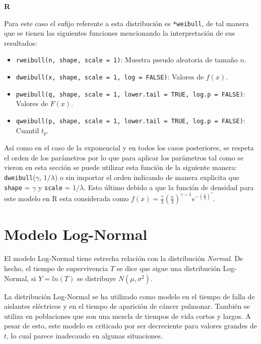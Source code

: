 \documentclass[
  a4paper,
  oneside,
  openany]{book}
\providecommand{\tightlist}{%
  \setlength{\itemsep}{0pt}\setlength{\parskip}{0pt}}
\begin{document}
\textbf{R}

Para este caso el sufijo referente a esta distribución es \texttt{*weibull}, de tal manera que se tienen las siguientes funciones mencionando la interpretación de sus resultados:

\begin{itemize}
\tightlist
\item
  \texttt{rweibull(n,\ shape,\ scale\ =\ 1)}: Muestra pseudo aleatoria de tamaño \(n\).
\item
  \texttt{dweibull(x,\ shape,\ scale\ =\ 1,\ log\ =\ FALSE)}: Valores de \(f(x)\).
\item
  \texttt{pweibull(q,\ shape,\ scale\ =\ 1,\ lower.tail\ =\ TRUE,\ log.p\ =\ FALSE)}: Valores de \(F(x)\).
\item
  \texttt{qweibull(p,\ shape,\ scale\ =\ 1,\ lower.tail\ =\ TRUE,\ log.p\ =\ FALSE)}: Cuantil \(t_p\).
\end{itemize}

Así como en el caso de la exponencial y en todos los casos posteriores, se respeta el orden de los parámetros por lo que para aplicar los parámetros tal como se vieron en esta sección se puede utilizar esta función de la siguiente manera: \texttt{dweibull}(\(\gamma\), \(1/\lambda\)) o sin importar el orden indicando de manera explicita que \texttt{shape} = \(\gamma\) y \texttt{scale} = \(1/\lambda\). Esto último debido a que la función de densidad para este modelo en R esta considerada como \(f(x) = \frac{\gamma}{\lambda}(\frac{x}{\lambda})^{\gamma-1}e^{-(\frac{x}{\lambda})^\gamma}\).

\hypertarget{modelo-log-normal}{%
\section{Modelo Log-Normal}\label{modelo-log-normal}}

El modelo Log-Normal tiene estrecha relación con la distribución \emph{Normal}. De hecho, el tiempo de supervivencia \(T\) se dice que sigue una distribución Log-Normal, si \(Y=ln(T)\) se distribuye \(N(\mu,\sigma^2)\).

La distribución Log-Normal se ha utilizado como modelo en el tiempo de falla de aislantes eléctricos y en el tiempo de aparición de cáncer pulmonar. También se utiliza en poblaciones que son una mezcla de tiempos de vida cortos y largos. A pesar de esto, este modelo es criticado por ser decreciente para valores grandes de \(t\), lo cual parece inadecaudo en algunas situaciones.
\end{document}
